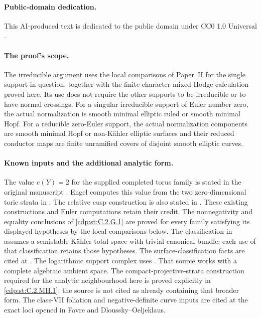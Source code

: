 \paragraph{Public-domain dedication.}
This AI-produced text is dedicated to the public domain under
CC0 1.0 Universal \cite{CC01Universal}.



\paragraph{The proof's scope.}
The irreducible argument uses the local comparisons of Paper~II
for the single support in question, together with the
finite-character mixed-Hodge calculation proved here. Its use
does not require the other supports to be irreducible or to have
normal crossings. For a singular irreducible support of Euler
number zero, the actual normalization is smooth minimal elliptic
ruled or smooth minimal Hopf. For a reducible zero-Euler support,
the actual normalization components are smooth minimal Hopf or
non-K\"ahler elliptic surfaces and their reduced conductor maps
are finite unramified covers of disjoint smooth elliptic curves.

\paragraph{Known inputs and the additional analytic form.}
The value $e(Y)=2$ for the supplied completed torus family
is stated in the original manuscript
\cite[Theorem on p.~4; Theorem~7.22, p.~60]{AC26}.
Engel computes this value from the two zero-dimensional
toric strata in \cite[Proposition~7.1]{Engel2026}.
The relative cusp construction is also stated in
\cite[Section~2, relative cusp theorem]{DGKX2026v1,DGKX2026v2}.
These existing constructions and Euler computations retain
their credit.  The nonnegativity and equality conclusions
of \ref{cdp:st:C.2.G.1} are proved for every family satisfying
its displayed hypotheses by the local comparisons below.
The classification in
\cite[Section~1 and Theorem~3.1]{KamenovaTori} assumes
a semistable K\"ahler total space with trivial canonical
bundle; each use of that classification retains those
hypotheses.
The surface-classification facts are cited at
\cite[Proposition~2.1 and Theorem~2.2, pp.~842--843]{Peters2021}.
The logarithmic support complex uses
\cite[Section~3, Theorem~1 and Corollary~2; Section~4, equation~(3)]{Steenbrink1999}.
That source works with a complete algebraic ambient space.
The compact-projective-strata construction required for the
analytic neighbourhood here is proved explicitly in
\ref{cdp:st:C.2.MH.1}; the source is not cited as already
containing that broader form. The class-VII foliation and
negative-definite curve inputs are cited at the exact loci
opened in Favre and Dloussky--Oeljeklaus.

